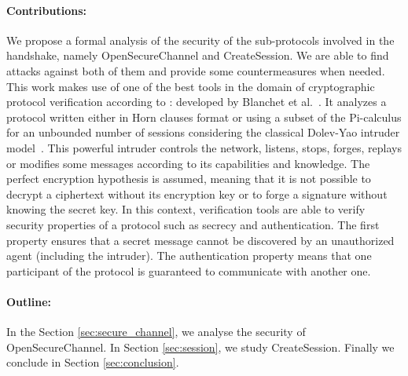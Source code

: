 \paragraph{Contributions:}

We propose a formal analysis of the security of
the sub-protocols involved in the \opcua handshake, namely \opcua
OpenSecureChannel and \opcua CreateSession.  We are able to find
attacks against both of them and provide some countermeasures when
needed.  This work makes use of one of the best tools in the domain of
cryptographic protocol verification according
to \cite{LP15}: \proverif developed by Blanchet et al.~\cite{Bla01}.
It analyzes a protocol written either in Horn clauses format or using
a subset of the Pi-calculus for an unbounded number of sessions
considering the classical Dolev-Yao intruder model~\cite{DY81}.  This
powerful intruder controls the network, listens, stops, forges,
replays or modifies some messages according to its capabilities and
knowledge.  The perfect encryption hypothesis is assumed, meaning that
it is not possible to decrypt a ciphertext without its encryption key
or to forge a signature without knowing the secret key.  In this
context, verification tools are able to verify security properties of
a protocol such as secrecy and authentication.  The first property
ensures that a secret message cannot be discovered by an unauthorized
agent (including the intruder).  The authentication property means
that one participant of the protocol is guaranteed to communicate with
another one.

\paragraph{Outline:} In the Section \ref{sec:secure_channel}, we analyse the
security of \opcua OpenSecureChannel. In Section \ref{sec:session}, we study
\opcua CreateSession. Finally we conclude in Section \ref{sec:conclusion}.
